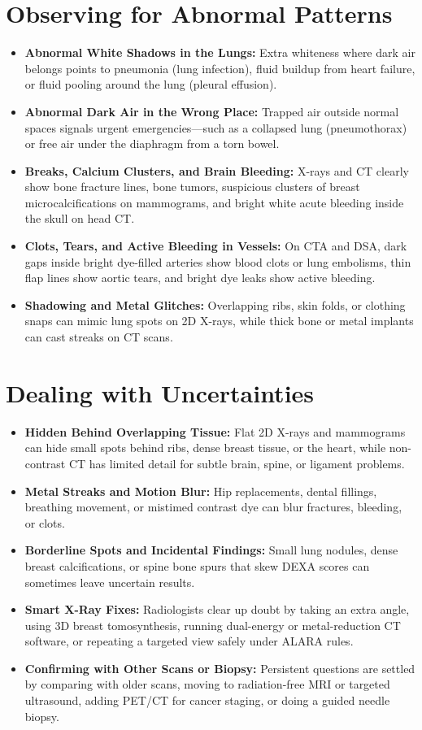 \section{Observing for Abnormal Patterns}
\begin{itemize}
  \item \textbf{Abnormal White Shadows in the Lungs:} Extra whiteness where dark air belongs points to pneumonia (lung infection), fluid buildup from heart failure, or fluid pooling around the lung (pleural effusion).
  \item \textbf{Abnormal Dark Air in the Wrong Place:} Trapped air outside normal spaces signals urgent emergencies---such as a collapsed lung (pneumothorax) or free air under the diaphragm from a torn bowel.
  \item \textbf{Breaks, Calcium Clusters, and Brain Bleeding:} X-rays and CT clearly show bone fracture lines, bone tumors, suspicious clusters of breast microcalcifications on mammograms, and bright white acute bleeding inside the skull on head CT.
  \item \textbf{Clots, Tears, and Active Bleeding in Vessels:} On CTA and DSA, dark gaps inside bright dye-filled arteries show blood clots or lung embolisms, thin flap lines show aortic tears, and bright dye leaks show active bleeding.
  \item \textbf{Shadowing and Metal Glitches:} Overlapping ribs, skin folds, or clothing snaps can mimic lung spots on 2D X-rays, while thick bone or metal implants can cast streaks on CT scans.
\end{itemize}

\section{Dealing with Uncertainties}
\begin{itemize}
  \item \textbf{Hidden Behind Overlapping Tissue:} Flat 2D X-rays and mammograms can hide small spots behind ribs, dense breast tissue, or the heart, while non-contrast CT has limited detail for subtle brain, spine, or ligament problems.
  \item \textbf{Metal Streaks and Motion Blur:} Hip replacements, dental fillings, breathing movement, or mistimed contrast dye can blur fractures, bleeding, or clots.
  \item \textbf{Borderline Spots and Incidental Findings:} Small lung nodules, dense breast calcifications, or spine bone spurs that skew DEXA scores can sometimes leave uncertain results.
  \item \textbf{Smart X-Ray Fixes:} Radiologists clear up doubt by taking an extra angle, using 3D breast tomosynthesis, running dual-energy or metal-reduction CT software, or repeating a targeted view safely under ALARA rules.
  \item \textbf{Confirming with Other Scans or Biopsy:} Persistent questions are settled by comparing with older scans, moving to radiation-free MRI or targeted ultrasound, adding PET/CT for cancer staging, or doing a guided needle biopsy.
\end{itemize}

